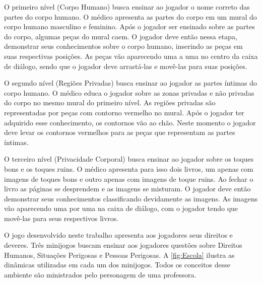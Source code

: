\begin{figure}
  \vspace{-1.0cm}
\end{figure}

O primeiro nível (Corpo Humano) busca ensinar ao jogador o nome correto das partes do corpo humano. O médico apresenta as partes do corpo em um mural do corpo humano masculino e feminino. Após o jogador ser ensinado sobre as partes do corpo, algumas peças do mural caem. O jogador deve então nessa etapa, demonstrar seus conhecimentos sobre o corpo humano, inserindo as peças em suas respectivas posições. As peças vão aparecendo uma a uma no centro da caixa de diálogo, sendo que o jogador deve arrastá-las e movê-las para suas posições. %


O segundo nível (Regiões Privadas) busca ensinar ao jogador as partes íntimas do corpo humano. O médico educa o jogador sobre as zonas privadas e não privadas do corpo no mesmo mural do primeiro nível. As regiões privadas são representadas por peças com contorno vermelho no mural. Após o jogador ter adquirido esse conhecimento, os contornos vão ao chão. Neste momento o jogador deve levar os contornos vermelhos para as peças que representam as partes íntimas.

O terceiro nível (Privacidade Corporal) busca ensinar ao jogador sobre os toques bons e os toques ruins. O médico apresenta para isso dois livros, um apenas com imagens de toques bons e outro apenas com imagens de toque ruins. Ao fechar o livro as páginas se desprendem e as imagens se misturam. O jogador deve então demonstrar seus conhecimentos classificando devidamente as imagens. As imagens vão aparecendo uma por uma na caixa de diálogo, com o jogador tendo que movê-las para seus respectivos livros. 

O jogo desenvolvido neste trabalho apresenta aos jogadores seus direitos e deveres. Três minijogos buscam ensinar aos jogadores questões sobre Direitos Humanos, Situações Perigosas e Pessoas Perigosas. A \autoref{fig:Escola} ilustra as dinâmicas utilizadas em cada um dos minijogos. Todos os conceitos desse ambiente são ministrados pelo personagem de uma professora. 

